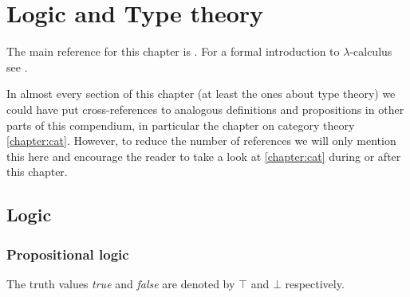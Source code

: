 \chapter{Logic and Type theory}

    The main reference for this chapter is \cite{hott}. For a formal introduction to $\lambda$-calculus see \cite{lambda_notes}.

    In almost every section of this chapter (at least the ones about type theory) we could have put cross-references to analogous definitions and propositions in other parts of this compendium, in particular the chapter on category theory \ref{chapter:cat}. However, to reduce the number of references we will only mention this here and encourage the reader to take a look at \ref{chapter:cat} during or after this chapter.

\section{Logic}
\subsection{Propositional logic}



    \begin{notation}
        The truth values \textit{true} and \textit{false} are denoted by $\top$ and $\bot$ respectively.
    \end{notation}


